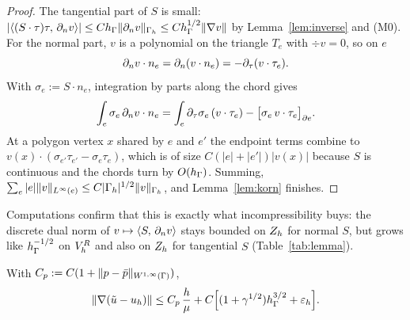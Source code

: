 \begin{proof}
The tangential part of $S$ is small: $|\langle (S\cdot\tau)\tau,\, \partial_n v\rangle|\le Ch_\Gamma\lVert \partial_n v\rVert_{\Gamma_h}\le Ch_\Gamma^{1/2}\lVert \nabla v\rVert$ by Lemma~\ref{lem:inverse} and (M0). For the normal part, $v$ is a polynomial on the triangle $T_e$ with $\div v=0$, so on $e$
\[
\partial_n v\cdot n_e=\partial_n(v\cdot n_e)=-\partial_\tau(v\cdot\tau_e).
\]
With $\sigma_e:=S\cdot n_e$, integration by parts along the chord gives
\[
\int_e\sigma_e\,\partial_n v\cdot n_e=\int_e\partial_\tau\sigma_e\,(v\cdot\tau_e)-\bigl[\sigma_e\,v\cdot\tau_e\bigr]_{\partial e}.
\]
At a polygon vertex $x$ shared by $e$ and $e'$ the endpoint terms combine to $v(x)\cdot(\sigma_{e'}\tau_{e'}-\sigma_e\tau_e)$, which is of size $C(|e|+|e'|)|v(x)|$ because $S$ is continuous and the chords turn by $O(h_\Gamma)$. Summing, $\sum_e|e|\lVert v\rVert_{L^\infty(e)}\le C|\Gamma_h|^{1/2}\lVert v\rVert_{\Gamma_h}$, and Lemma~\ref{lem:korn} finishes.
\end{proof}

Computations confirm that this is exactly what incompressibility buys: the discrete dual norm of $v\mapsto\langle S,\, \partial_n v\rangle$ stays bounded on $Z_h$ for normal $S$, but grows like $h_\Gamma^{-1/2}$ on $V_h^R$ and also on $Z_h$ for tangential $S$ (Table~\ref{tab:lemma}).

\begin{theorem}\label{thm:C}
With $C_p:=C(1+\lVert p-\bar p\rVert_{W^{1,\infty}(\Gamma)})$,
\[
\lVert \nabla(\tilde u-u_h)\rVert\le C_p\,\frac h\mu+C\Bigl[(1+\gamma^{1/2})h_\Gamma^{3/2}+\varepsilon_h\Bigr].
\]
\end{theorem}

